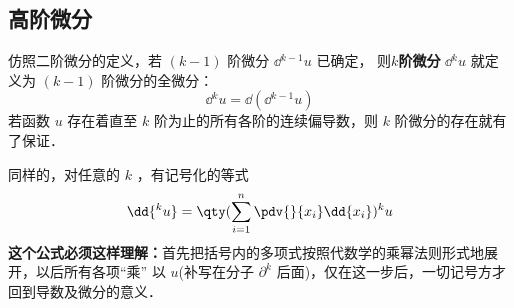 \subsection{高阶微分}
仿照二阶微分的定义，若 $(k-1)$ 阶微分 $\dd{^{k-1}}u$ 已确定， 则\textbf{$k$阶微分} $\dd{^ku}$ 就定义为 $(k-1)$ 阶微分的全微分：
\begin{equation}
\dd{^k u}=\dd{(\dd{^{k-1}}u)}
\end{equation}
若函数 $u$ 存在着直至 $k$ 阶为止的所有各阶的连续偏导数，则 $k$ 阶微分的存在就有了保证．

 同样的，对任意的 $k$ ，有记号化的等式
 \begin{equation}\label{MHDiff_eq1}
 \dd{^ku}=\qty(\sum_{i=1}^n\pdv{}{x_i}\dd{x_i})^k u
 \end{equation}
 \textbf{这个公式必须这样理解：}首先把括号内的多项式按照代数学的乘幂法则形式地展开，以后所有各项“乘” 以 $u$(补写在分子 $\partial^k$ 后面)，仅在这一步后，一切记号方才回到导数及微分的意义．
 \subsubsection{}